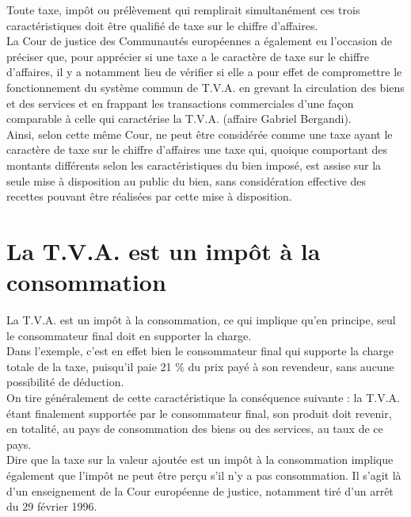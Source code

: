 \documentclass{book}
\begin{document}
\null 
Toute taxe, impôt ou prélèvement qui remplirait simultanément ces trois caractéristiques doit
être qualifié de taxe sur le chiffre d'affaires.\\

La Cour de justice des Communautés européennes a également eu l'occasion de préciser que,
pour apprécier si une taxe a le caractère de taxe sur le chiffre d'affaires, il y a notamment lieu
de vérifier si elle a pour effet de compromettre le fonctionnement du système commun de
T.V.A. en grevant la circulation des biens et des services et en frappant les transactions
commerciales d'une façon comparable à celle qui caractérise la T.V.A. (affaire Gabriel
Bergandi).\\

Ainsi, selon cette même Cour, ne peut être considérée comme une taxe ayant le caractère de
taxe sur le chiffre d'affaires une taxe qui, quoique comportant des montants différents selon
les caractéristiques du bien imposé, est assise sur la seule mise à disposition au public du bien,
sans considération effective des recettes pouvant être réalisées par cette mise à disposition.\\

\section{La T.V.A. est un impôt à la consommation}

La T.V.A. est un impôt à la consommation, ce qui implique qu'en principe, seul le
consommateur final doit en supporter la charge.\\

Dans l'exemple, c'est en effet bien le consommateur final qui supporte la charge totale de la
taxe, puisqu'il paie 21 \% du prix payé à son revendeur, sans aucune possibilité de déduction.\\

On tire généralement de cette caractéristique la conséquence suivante : la T.V.A. étant
finalement supportée par le consommateur final, son produit doit revenir, en totalité, au pays
de consommation des biens ou des services, au taux de ce pays.\\

Dire que la taxe sur la valeur ajoutée est un impôt à la consommation implique également que
l'impôt ne peut être perçu s'il n'y a pas consommation. Il s'agit là d'un enseignement de la
Cour européenne de justice, notamment tiré d'un arrêt du 29 février 1996.\\
\end{document}
